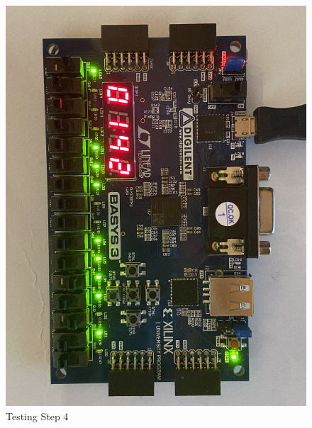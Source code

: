 \documentclass[11pt]{article}
\begin{document}
\begin{figure}[ht]\centering
	\includegraphics[angle=0, width=1.0\textwidth]{IMG_6749.jpg}
	\caption{Testing Step 4}
	\label{fig:sim_with_table}
\end{figure}
\clearpage
\end{document}
